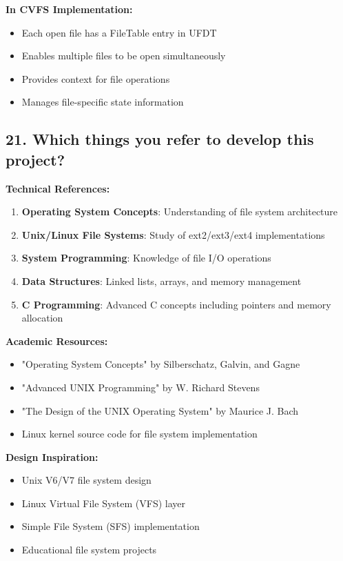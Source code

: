 \documentclass[11pt,a4paper]{article}
\begin{document}
\textbf{In CVFS Implementation:}
\begin{itemize}
    \item Each open file has a FileTable entry in UFDT
    \item Enables multiple files to be open simultaneously
    \item Provides context for file operations
    \item Manages file-specific state information
\end{itemize}

\subsection{21. Which things you refer to develop this project?}

\textbf{Technical References:}
\begin{enumerate}
    \item \textbf{Operating System Concepts}: Understanding of file system architecture
    \item \textbf{Unix/Linux File Systems}: Study of ext2/ext3/ext4 implementations
    \item \textbf{System Programming}: Knowledge of file I/O operations
    \item \textbf{Data Structures}: Linked lists, arrays, and memory management
    \item \textbf{C Programming}: Advanced C concepts including pointers and memory allocation
\end{enumerate}

\textbf{Academic Resources:}
\begin{itemize}
    \item "Operating System Concepts" by Silberschatz, Galvin, and Gagne
    \item "Advanced UNIX Programming" by W. Richard Stevens
    \item "The Design of the UNIX Operating System" by Maurice J. Bach
    \item Linux kernel source code for file system implementation
\end{itemize}

\textbf{Design Inspiration:}
\begin{itemize}
    \item Unix V6/V7 file system design
    \item Linux Virtual File System (VFS) layer
    \item Simple File System (SFS) implementation
    \item Educational file system projects
\end{itemize}
\end{document}
